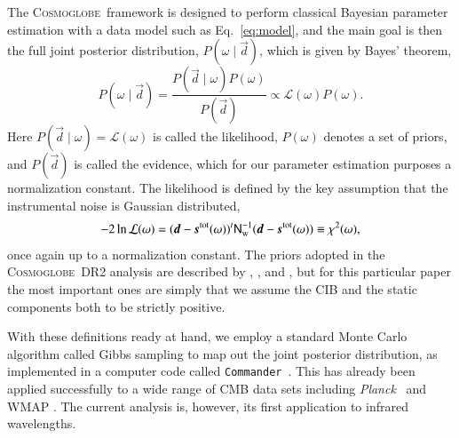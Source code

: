 \documentclass{aa}
\def\commander{\texttt{Commander}}
\def\Planck{\textit{Planck}}
\newcommand{\dv}[0]{\vec{d}}
\newcommand{\s}[0]{\vec{s}}
\newcommand{\N}[0]{\tens{N}}
\newcommand{\cosmoglobe}{\textsc{Cosmoglobe}}
\begin{document}
The \cosmoglobe\ framework is designed to perform classical Bayesian
parameter estimation with a data model such as Eq.~\eqref{eq:model},
and the main goal is then the full joint posterior distribution,
$P(\omega\mid\dv)$, which is given by Bayes' theorem,
\begin{equation}
P(\omega\mid\dv) = \frac{P(\dv\mid\omega) P(\omega)}{P(\dv)} \propto
\mathcal{L}(\omega) P(\omega).
\end{equation}
Here $P(\dv\mid\omega) = \mathcal{L}(\omega)$ is called the likelihood,
$P(\omega)$ denotes a set of priors, and $P(\dv)$ is called the evidence,
which for our parameter estimation purposes a 
normalization constant. The likelihood is defined by the key assumption that
the instrumental noise is Gaussian distributed,
\begin{equation}
-2\ln\mathcal{L}(\omega) = (\dv-\s^{\mathrm{tot}}(\omega))^t
  \N_{\mathrm{w}}^{-1}(\dv-\s^{\mathrm{tot}}(\omega)) \equiv \chi^2(\omega),
\end{equation}
once again up to a normalization constant. The priors
adopted in the \cosmoglobe\ DR2 analysis are described by
\citet{CG02_01}, \citet{CG02_02}, and \citet{CG02_04}, but for this particular paper the
most important ones are simply that we assume the CIB and the
static components both to be strictly positive. 

With these definitions ready at hand, we employ a standard Monte Carlo
algorithm called Gibbs sampling \citep[e.g.,][]{geman:1984} to map out
the joint posterior distribution, as implemented in a computer code
called \commander\ \citep{eriksen:2004,seljebotn:2019,bp03}. This has
already been applied successfully to a wide range of CMB data sets
including \Planck\ \citep{planck2014-a12,bp01} and WMAP
\citep{watts2023_dr1}. The current analysis is, however, its first
application to infrared wavelengths.
\end{document}
